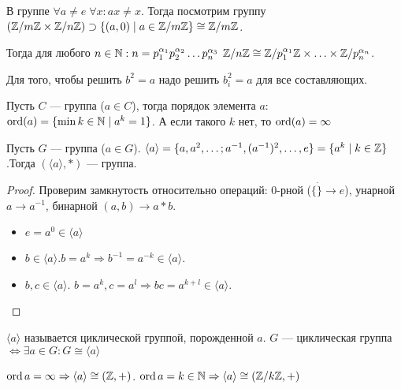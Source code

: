 В группе $\forall a \neq e\; \forall x: ax \neq x$. Тогда посмотрим группу  $(\mathbb{Z} / m\mathbb{Z} \times \mathbb{Z} / n\mathbb{Z}) \supset \{(a, 0) \mid a \in \mathbb{Z} / m\mathbb{Z}\} \cong \mathbb{Z} / m\mathbb{Z}$.
 
Тогда для любого $n \in \mathbb{N}: n = p_1^{\alpha_1} p_2^{\alpha_2}\ldots p_n^{\alpha_3}$  $\mathbb{Z} / n\mathbb{Z} \cong \mathbb{Z} / p_1^{\alpha_1}\mathbb{Z} \times \ldots \times \mathbb{Z} / p_n^{\alpha_n}$.
\begin{example}
    Для того, чтобы решить $b^2 = a$ надо решить  $b_i^2 = a$ для все составляющих.
\end{example}
\begin{definition}
    Пусть $C$ --- группа ($a \in C$), тогда порядок элемента $a$:  $\operatorname{ord}(a) = \{\min k \in \mathbb{N} \mid a^k = 1\}$. А если такого  $k$ нет, то  $\operatorname{ord}(a) = \infty$
\end{definition}
\begin{lemma}
    Пусть $G$ --- группа ($a \in G$). $\langle a \rangle = \{a, a^2,\ldots; a^{-1}, (a^{-1})^2, \ldots, e\} = \{a^k \mid k \in \mathbb{Z}\}$.Тогда $(\langle a \rangle, *)$ --- группа.
\end{lemma}
\begin{proof}
    Проверим замкнутость относительно операций: 0-рной ($\{\dot\} \to e$), унарной $a \to a^{-1}$, бинарной  $(a, b) \to a * b$.
    \begin{itemize}
        \item $e = a^0 \in \langle a \rangle$
        \item  $b \in \langle a \rangle. b = a^k \Rightarrow b^{-1} = a^{-k} \in \langle a \rangle$.
        \item  $b, c \in \langle a \rangle$.  $b = a^k, c = a^l \Rightarrow bc = a^{k+l} \in \langle a \rangle$.
    \end{itemize}
\end{proof}
\begin{definition}
    $\langle a \rangle$ называется циклической группой, порожденной  $a$.  $G$ --- циклическая группа  $ \iff \exists a \in G\!: G \cong \langle a \rangle$
\end{definition}
\begin{theorem}
    $\operatorname{ord} a = \infty \Rightarrow \langle a \rangle \cong (\mathbb{Z}, +)$.  $\operatorname{ord} a = k \in \mathbb{N} \Rightarrow \langle a \rangle \cong (\mathbb{Z} / k\mathbb{Z}, +)$
\end{theorem}
